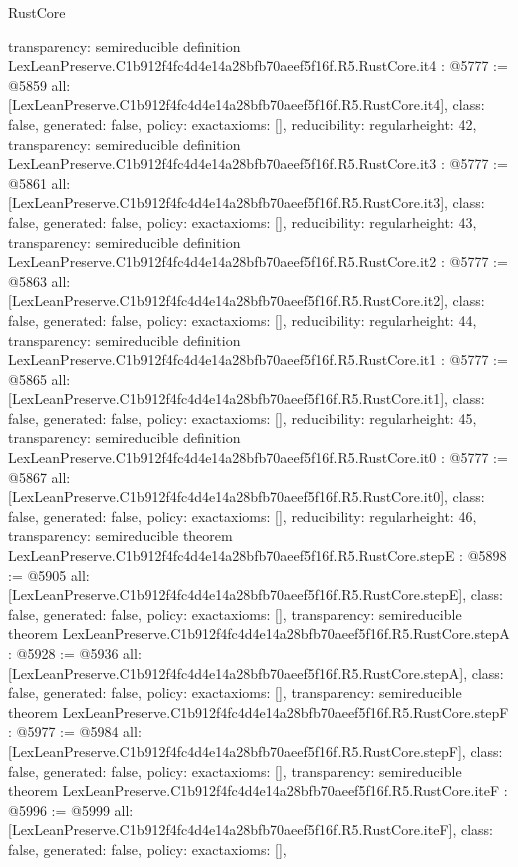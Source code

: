 \begin{lexlean}{RustCore}
\begin{coremodule}
{  transparency: semireducible
}
definition LexLeanPreserve.C1b912f4fc4d4e14a28bfb70aeef5f16f.R5.RustCore.it4 : @5777 := @5859 {
  all: [LexLeanPreserve.C1b912f4fc4d4e14a28bfb70aeef5f16f.R5.RustCore.it4],
  class: false,
  generated: false,
  policy: exact{axioms: []},
  reducibility: regular{height: 42},
  transparency: semireducible
}
definition LexLeanPreserve.C1b912f4fc4d4e14a28bfb70aeef5f16f.R5.RustCore.it3 : @5777 := @5861 {
  all: [LexLeanPreserve.C1b912f4fc4d4e14a28bfb70aeef5f16f.R5.RustCore.it3],
  class: false,
  generated: false,
  policy: exact{axioms: []},
  reducibility: regular{height: 43},
  transparency: semireducible
}
definition LexLeanPreserve.C1b912f4fc4d4e14a28bfb70aeef5f16f.R5.RustCore.it2 : @5777 := @5863 {
  all: [LexLeanPreserve.C1b912f4fc4d4e14a28bfb70aeef5f16f.R5.RustCore.it2],
  class: false,
  generated: false,
  policy: exact{axioms: []},
  reducibility: regular{height: 44},
  transparency: semireducible
}
definition LexLeanPreserve.C1b912f4fc4d4e14a28bfb70aeef5f16f.R5.RustCore.it1 : @5777 := @5865 {
  all: [LexLeanPreserve.C1b912f4fc4d4e14a28bfb70aeef5f16f.R5.RustCore.it1],
  class: false,
  generated: false,
  policy: exact{axioms: []},
  reducibility: regular{height: 45},
  transparency: semireducible
}
definition LexLeanPreserve.C1b912f4fc4d4e14a28bfb70aeef5f16f.R5.RustCore.it0 : @5777 := @5867 {
  all: [LexLeanPreserve.C1b912f4fc4d4e14a28bfb70aeef5f16f.R5.RustCore.it0],
  class: false,
  generated: false,
  policy: exact{axioms: []},
  reducibility: regular{height: 46},
  transparency: semireducible
}
theorem LexLeanPreserve.C1b912f4fc4d4e14a28bfb70aeef5f16f.R5.RustCore.stepE : @5898 := @5905 {
  all: [LexLeanPreserve.C1b912f4fc4d4e14a28bfb70aeef5f16f.R5.RustCore.stepE],
  class: false,
  generated: false,
  policy: exact{axioms: []},
  transparency: semireducible
}
theorem LexLeanPreserve.C1b912f4fc4d4e14a28bfb70aeef5f16f.R5.RustCore.stepA : @5928 := @5936 {
  all: [LexLeanPreserve.C1b912f4fc4d4e14a28bfb70aeef5f16f.R5.RustCore.stepA],
  class: false,
  generated: false,
  policy: exact{axioms: []},
  transparency: semireducible
}
theorem LexLeanPreserve.C1b912f4fc4d4e14a28bfb70aeef5f16f.R5.RustCore.stepF : @5977 := @5984 {
  all: [LexLeanPreserve.C1b912f4fc4d4e14a28bfb70aeef5f16f.R5.RustCore.stepF],
  class: false,
  generated: false,
  policy: exact{axioms: []},
  transparency: semireducible
}
theorem LexLeanPreserve.C1b912f4fc4d4e14a28bfb70aeef5f16f.R5.RustCore.iteF : @5996 := @5999 {
  all: [LexLeanPreserve.C1b912f4fc4d4e14a28bfb70aeef5f16f.R5.RustCore.iteF],
  class: false,
  generated: false,
  policy: exact{axioms: []},
}
\end{coremodule}
\end{lexlean}
